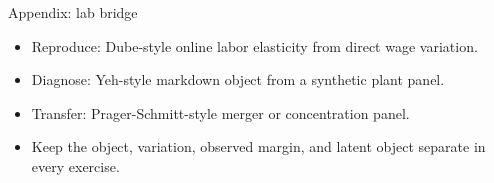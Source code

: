 \documentclass[aspectratio=169,11pt]{beamer}
\begin{document}
\appendix

\begin{frame}{Appendix: lab bridge}
\begin{itemize}
    \item Reproduce: Dube-style online labor elasticity from direct wage variation.
    \item Diagnose: Yeh-style markdown object from a synthetic plant panel.
    \item Transfer: Prager-Schmitt-style merger or concentration panel.
    \item Keep the object, variation, observed margin, and latent object separate in every exercise.
\end{itemize}
\end{frame}
\end{document}
